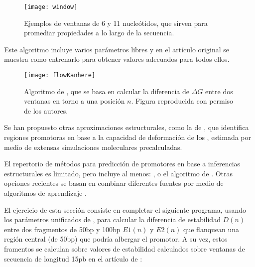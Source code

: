 \begin{figure}
\begin{center} 
\texttt{[image: window]}
\caption{Ejemplos de ventanas de 6 y 11 nucle\'{o}tidos, que sirven para promediar propiedades a lo largo de la secuencia.}
\label{fig:window}
\end{center}
\end{figure}

Este algoritmo incluye varios par\'{a}metros libres y en el art\'{i}culo original se muestra como entrenarlo para obtener valores adecuados para todos ellos.

\begin{figure}
\begin{center} 
\texttt{[image: flowKanhere]}
\caption{Algoritmo de \cite{Kanhere2005}, que se basa en calcular la diferencia de $\Delta G$ entre dos ventanas en torno a una posici\'{o}n $n$.
Figura reproducida con permiso de los autores.}
\label{fig:Kanhere}
\end{center}
\end{figure}

Se han propuesto otras aproximaciones estructurales, como la de \cite{Gogni2007}, %
que identifica regiones promotoras en base a la capacidad de deformaci\'{o}n de los 
,
estimada por medio de extensas simulaciones moleculares precalculadas. 

El repertorio de m\'{e}todos para predicci\'{o}n de promotores en base a inferencias estructurales es limitado, pero incluye al menos: 
, 
o el algoritmo de \citet{Song2012}. Otras opciones recientes se basan en combinar diferentes fuentes por medio de algoritmos de aprendizaje \citep{Eser2016}.

El ejercicio de esta secci\'{o}n consiste en completar el siguiente programa, usando los par\'{a}metros unificados de \cite{SantaLucia1998},
para calcular la diferencia de estabilidad $D(n)$ entre dos fragmentos de 50bp y 100bp $E1(n)$ y $E2(n)$ 
que flanquean una regi\'{o}n central (de 50bp) que podr\'{i}a albergar el promotor.
A su vez, estos framentos se calculan sobre valores de estabilidad calculados sobre ventanas de secuencia 
de longitud 15pb en el art\'{i}culo de \cite{Kanhere2005}:


